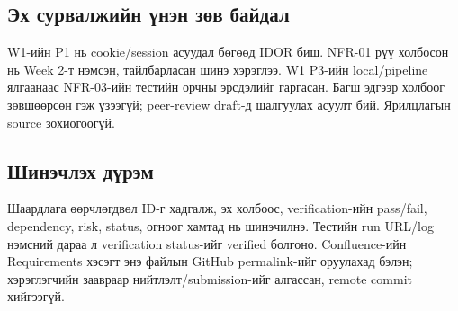 \subsection{Эх сурвалжийн үнэн зөв
байдал}\label{doc5-ux44dux445-ux441ux443ux440ux432ux430ux43bux436ux438ux439ux43d-ux4afux43dux44dux43d-ux437ux4e9ux432-ux431ux430ux439ux434ux430ux43b}

W1-ийн P1 нь cookie/session асуудал бөгөөд IDOR биш. NFR-01 рүү холбосон
нь Week 2-т нэмсэн, тайлбарласан шинэ хэрэглээ. W1 P3-ийн local/pipeline
ялгаанаас NFR-03-ийн тестийн орчны эрсдэлийг гаргасан. Багш эдгээр
холбоог зөвшөөрсөн гэж үзээгүй;
\href{wiki/peer-review-draft.md}{peer-review draft}-д шалгуулах асуулт
бий. Ярилцлагын source зохиогоогүй.

\subsection{Шинэчлэх
дүрэм}\label{doc5-ux448ux438ux43dux44dux447ux43bux44dux445-ux434ux4afux440ux44dux43c}

Шаардлага өөрчлөгдвөл ID-г хадгалж, эх холбоос, verification-ийн
pass/fail, dependency, risk, status, огноог хамтад нь шинэчилнэ. Тестийн
run URL/log нэмсний дараа л verification status-ийг verified болгоно.
Confluence-ийн Requirements хэсэгт энэ файлын GitHub permalink-ийг
оруулахад бэлэн; хэрэглэгчийн заавраар нийтлэлт/submission-ийг алгассан,
remote commit хийгээгүй.
